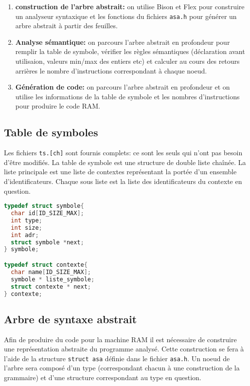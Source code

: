 \documentclass[a4paper,10pt, oneside]{article}
\begin{document}
\begin{enumerate}
\item \textbf{construction de l'arbre abstrait:} on utilise Bison et Flex pour
  construire un analyseur syntaxique et les fonctions du fichiers
  \texttt{asa.h} pour générer un arbre abstrait à partir des feuilles.
\item \textbf{Analyse sémantique:} on parcours l'arbre abstrait en
  profondeur pour remplir la table de symbole, vérifier les règles
  sémantiques (déclaration avant utilisaion, valeurs min/max des
  entiers etc) et calculer au cours des retours arrières le nombre
  d'instructions correspondant à chaque noeud.
\item \textbf{Génération de code:} on parcours l'arbre abstrait en
  profondeur et on utilise les informations de la table de symbole et
  les nombres d'instructions pour produire le code RAM.

\end{enumerate}

\subsection*{Table de symboles}

Les fichiers \texttt{ts.[ch]} sont fournis complets: ce sont les seuls
qui n'ont pas besoin d'être modifiés. La table de symbole est une
structure de double liste chaînée. La liste principale est une liste
de contextes représentant la portée d'un ensemble
d'identificateurs. Chaque sous liste est la liste des identificateurs
du contexte en question.

\begin{lstlisting}[language=C]
typedef struct symbole{
  char id[ID_SIZE_MAX];
  int type; 
  int size;
  int adr;
  struct symbole *next;
} symbole;

typedef struct contexte{
  char name[ID_SIZE_MAX];
  symbole * liste_symbole;
  struct contexte * next;
} contexte;
\end{lstlisting}

\subsection*{Arbre de syntaxe abstrait}

Afin de produire du code pour la machine RAM il est nécessaire de
construire une représentation abstraite du programme analysé. Cette
construction se fera à l'aide de la structure \texttt{struct asa}
définie dans le fichier \texttt{asa.h}. Un noeud de l'arbre sera
composé d'un type (correspondant chacun à une construction de la
grammaire) et d'une structure correspondant au type en question.
\end{document}
